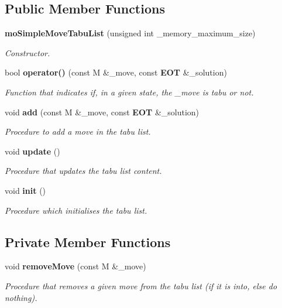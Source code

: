 \subsection*{Public Member Functions}
\begin{CompactItemize}
\item 
{\bf mo\-Simple\-Move\-Tabu\-List} (unsigned int \_\-memory\_\-maximum\_\-size)\label{classmo_simple_move_tabu_list_a0}

\begin{CompactList}\small\item\em Constructor. \item\end{CompactList}\item 
bool {\bf operator()} (const M \&\_\-move, const {\bf EOT} \&\_\-solution)
\begin{CompactList}\small\item\em Function that indicates if, in a given state, the \_\-move is tabu or not. \item\end{CompactList}\item 
void {\bf add} (const M \&\_\-move, const {\bf EOT} \&\_\-solution)
\begin{CompactList}\small\item\em Procedure to add a move in the tabu list. \item\end{CompactList}\item 
void {\bf update} ()
\begin{CompactList}\small\item\em Procedure that updates the tabu list content. \item\end{CompactList}\item 
void {\bf init} ()
\begin{CompactList}\small\item\em Procedure which initialises the tabu list. \item\end{CompactList}\end{CompactItemize}
\subsection*{Private Member Functions}
\begin{CompactItemize}
\item 
void {\bf remove\-Move} (const M \&\_\-move)
\begin{CompactList}\small\item\em Procedure that removes a given move from the tabu list (if it is into, else do nothing). \item\end{CompactList}\end{CompactItemize}
